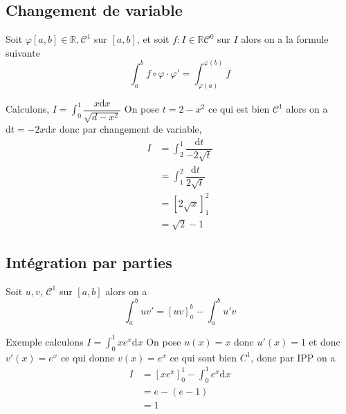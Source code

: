 \documentclass[11pt,colorlinks]{book}
\theoremstyle{mytheoremstyle}
\theoremstyle{mytheoremstyle}
\theoremstyle{mytheoremstyle}
\theoremstyle{mytheoremstyle}
\theoremstyle{mytheoremstyle}
\theoremstyle{mytheoremstyle}
\theoremstyle{mytheoremstyle}
\theoremstyle{mytheoremstyle}
\theoremstyle{myproblemstyle}
\def\mbb#1{\mathbb{#1}}
\def\bR{\mbb{R}}
\begin{document}
  \subsection{Changement de variable}
  \begin{theorem}
    Soit $\varphi [a,b] \in \bR, \mathcal{C}^1$ sur $[a,b]$, et soit $f : I \in \bR \mathcal{C^0}$ sur $I$ alors on a la formule suivante
    \begin{equation*}
      \int_a^b f \circ \varphi \cdot \varphi' = \int_{\varphi(a)}^{\varphi(b)} f
    \end{equation*}
  \end{theorem}
  \begin{ex}
    Calculons, $I = \int_0^1 \dfrac{x \text{d}x}{\sqrt{d - x^2}}$
    On pose $t = 2 - x^2$ ce qui est bien $\mathcal{C}^1$ alors on a $\text{d}t = -2x \text{d}x$ 
    donc par changement de variable,
    \begin{align*}
      I &= \int_2^1 \dfrac{\text{d}t}{-2\sqrt{t}} \\ 
        &= \int_1^2 \dfrac{\text{d}t}{2\sqrt{t}} \\ 
        &= \left[2\sqrt{x}\right]_1^2 \\ 
        &= \sqrt{2} - 1
    \end{align*}
  \end{ex}
  \subsection{Intégration par parties}
  \begin{theorem}
    Soit $u,v$, $\mathcal{C}^1$ sur $[a,b]$ alors on a 
    \begin{equation*}
      \int_a^b uv' = [uv]_a^b - \int_a^b u'v
    \end{equation*}
  \end{theorem}
  \begin{ex}
    Exemple calculons $I = \int_0^1 xe^x \text{d}x$
    On pose $u(x) = x$ donc $u'(x) = 1$ et donc $v'(x) = e^x$ ce qui donne $v(x) = e^x$ ce qui sont bien $C^1$,
    donc par IPP on a 
    \begin{align*}
      I &= [xe^x]_0^1 - \int_0^1 e^x \text{d}x \\ 
      &= e - (e - 1) \\ 
      &= 1
    \end{align*}
  \end{ex}
\end{document}
